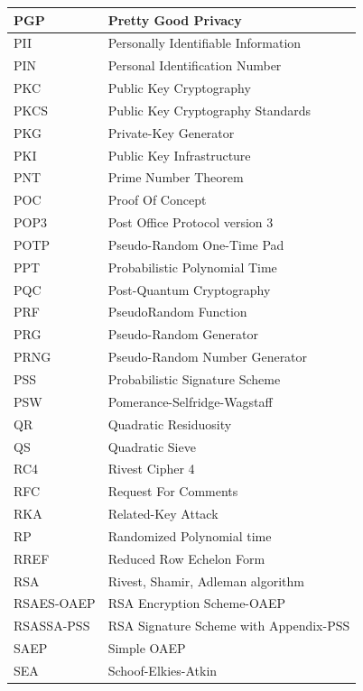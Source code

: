 \documentclass[a4paper, 12pt]{book} %
\begin{document}
\begin{longtable}{||lp{11cm}||}
    PGP & Pretty Good Privacy \\ \hline 
    PII & Personally Identifiable Information \\ \hline
    PIN & Personal Identification Number \\ \hline 
    PKC & Public Key Cryptography  \\ \hline 
    PKCS & Public Key Cryptography Standards \\ \hline 
    PKG & Private-Key Generator \\ \hline 
    PKI & Public Key Infrastructure \\ \hline 
    PNT & Prime Number Theorem \\ \hline 
    POC & Proof Of Concept \\ \hline 
    POP3 & Post Office Protocol version 3 \\ \hline 
    POTP & Pseudo-Random One-Time Pad \\ \hline 
    PPT & Probabilistic Polynomial Time \\ \hline 
    PQC & Post-Quantum Cryptography \\ \hline 
    PRF & PseudoRandom Function \\ \hline 
    PRG & Pseudo-Random Generator \\ \hline 
    PRNG & Pseudo-Random Number Generator \\ \hline 
    PSS & Probabilistic Signature Scheme \\ \hline 
    PSW & Pomerance-Selfridge-Wagstaff \\ \hline 
    QR & Quadratic Residuosity \\ \hline 
    QS & Quadratic Sieve \\ \hline 
    RC4 & Rivest Cipher 4 \\ \hline 
    RFC & Request For Comments \\ \hline 
    RKA & Related-Key Attack \\ \hline 
    RP & Randomized Polynomial time \\ \hline 
    RREF & Reduced Row Echelon Form \\ \hline 
    RSA & Rivest, Shamir, Adleman algorithm \\ \hline 
    RSAES-OAEP & RSA Encryption Scheme-OAEP \\ \hline 
    RSASSA-PSS & RSA Signature Scheme with Appendix-PSS \\ \hline 
    SAEP & Simple OAEP \\ \hline 
    SEA & Schoof-Elkies-Atkin \\ \hline 

\end{longtable}
\end{document}
